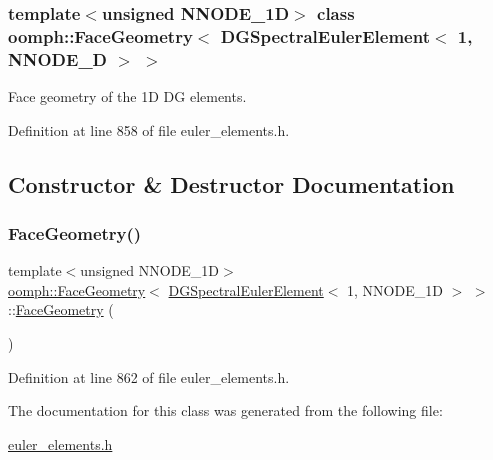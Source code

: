 \subsubsection*{template$<$unsigned N\+N\+O\+D\+E\+\_\+1D$>$\newline
class oomph\+::\+Face\+Geometry$<$ D\+G\+Spectral\+Euler\+Element$<$ 1, N\+N\+O\+D\+E\+\_\+D $>$ $>$}

Face geometry of the 1D DG elements. 

Definition at line 858 of file euler\+\_\+elements.\+h.



\subsection{Constructor \& Destructor Documentation}
\mbox{\label{classoomph_1_1FaceGeometry_3_01DGSpectralEulerElement_3_011_00_01NNODE__1D_01_4_01_4_a62891e42b176cb7a757ca315d962a988}} 
\subsubsection{\texorpdfstring{Face\+Geometry()}{FaceGeometry()}}
{\footnotesize\ttfamily template$<$unsigned N\+N\+O\+D\+E\+\_\+1D$>$ \\
\hyperlink{classoomph_1_1FaceGeometry}{oomph\+::\+Face\+Geometry}$<$ \hyperlink{classoomph_1_1DGSpectralEulerElement}{D\+G\+Spectral\+Euler\+Element}$<$ 1, N\+N\+O\+D\+E\+\_\+1D $>$ $>$\+::\hyperlink{classoomph_1_1FaceGeometry}{Face\+Geometry} (\begin{DoxyParamCaption}{ }\end{DoxyParamCaption})\hspace{0.3cm}{\ttfamily [inline]}}



Definition at line 862 of file euler\+\_\+elements.\+h.



The documentation for this class was generated from the following file\+:\begin{DoxyCompactItemize}
\item 
\hyperlink{euler__elements_8h}{euler\+\_\+elements.\+h}\end{DoxyCompactItemize}
